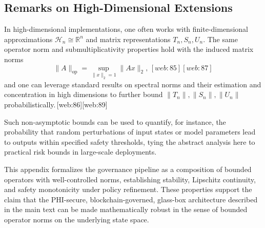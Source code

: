 \documentclass[11pt]{article}
\begin{document}
\subsection{Remarks on High-Dimensional Extensions}

In high-dimensional implementations, one often works with finite-dimensional approximations $\mathcal{H}_n \cong \mathbb{R}^n$ and matrix representations $T_n, S_n, U_n$. 
The same operator norm and submultiplicativity properties hold with the induced matrix norms
\[
  \|A\|_{\mathrm{op}} = \sup_{\|x\|_2 = 1} \|A x\|_2,\,[web:85][web:87]
\]
and one can leverage standard results on spectral norms and their estimation and concentration in high dimensions to further bound $\|T_n\|, \|S_n\|, \|U_n\|$ probabilistically.\,[web:86][web:89]

Such non-asymptotic bounds can be used to quantify, for instance, the probability that random perturbations of input states or model parameters lead to outputs within specified safety thresholds, tying the abstract analysis here to practical risk bounds in large-scale deployments.

\bigskip

This appendix formalizes the governance pipeline as a composition of bounded operators with well-controlled norms, establishing stability, Lipschitz continuity, and safety monotonicity under policy refinement. 
These properties support the claim that the PHI-secure, blockchain-governed, glass-box architecture described in the main text can be made mathematically robust in the sense of bounded operator norms on the underlying state space.

\nocite{*}
  

\end{document}
